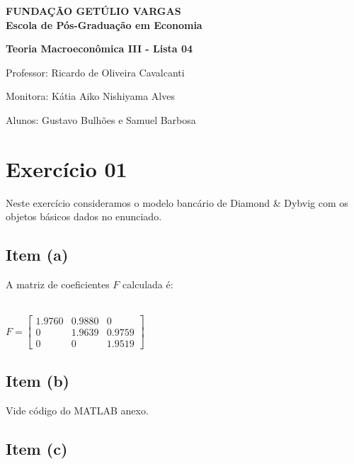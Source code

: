 \documentclass{article}
\begin{document}
\begin{flushleft}

\textbf{FUNDAÇÃO GETÚLIO VARGAS} \\



\textbf{Escola de Pós-Graduação em Economia}



\textbf{Teoria Macroeconômica III - Lista 04}



Professor: Ricardo de Oliveira Cavalcanti



Monitora: Kátia Aiko Nishiyama Alves



Alunos: Gustavo Bulhões e Samuel Barbosa

\end{flushleft}



\section*{Exercício 01}

Neste exercício consideramos o modelo bancário de Diamond \& Dybvig com os objetos básicos dados no enunciado. 



\subsection*{Item (a)}

A matriz de coeficientes $F$ calculada é: 
\\
\\
\begin{center}

$F
=
\begin{bmatrix}
    1.9760 & 0.9880 & 0  \\
    0 & 1.9639 & 0.9759 \\
    0 & 0 & 1.9519 
\end{bmatrix}
$

\end{center}


\subsection*{Item (b)}

Vide código do MATLAB anexo.


\subsection*{Item (c)}
\end{document}
